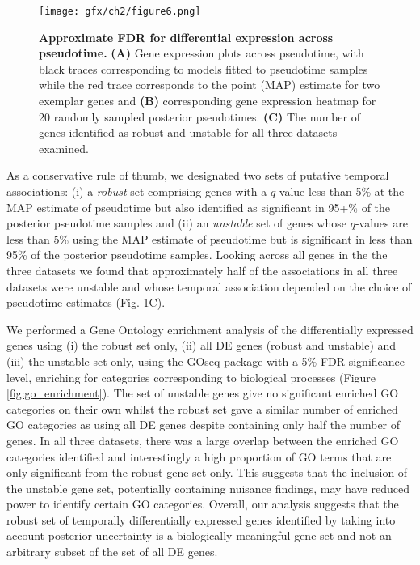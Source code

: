\begin{figure}
	\centering
	\texttt{[image: gfx/ch2/figure6.png]}
\caption{ {\bf Approximate FDR for differential expression across pseudotime.}
\textbf{(A)} Gene expression plots across pseudotime, with black traces corresponding to models fitted to pseudotime samples while the red trace corresponds to the point (MAP) estimate for two exemplar genes and \textbf{(B)} corresponding gene expression heatmap for 20 randomly sampled posterior pseudotimes.
\textbf{(C)} The number of genes identified as robust and unstable for all three datasets examined.}
\label{fig:afdr}
\end{figure}

As a conservative rule of thumb, we designated two sets of putative temporal associations: (i) a \emph{robust} set comprising genes with a $q$-value less than 5\% at the MAP estimate of pseudotime but also identified as significant in 95+\% of the posterior pseudotime samples and (ii) an \emph{unstable} set of genes whose $q$-values are less than 5\% using the MAP estimate of pseudotime but is significant in less than 95\% of the posterior pseudotime samples. Looking across all genes in the the three datasets we found that approximately half of the associations in all three datasets were unstable and whose temporal association depended on the choice of pseudotime estimates (Fig. \ref{fig:afdr}C).

We performed a Gene Ontology enrichment analysis of the differentially expressed genes using (i) the robust set only, (ii) all DE genes (robust and unstable) and (iii) the unstable set only, using the GOseq package \cite{young2010gene} with a 5\% FDR significance level, enriching for categories corresponding to biological processes (Figure \ref{fig:go_enrichment}). The set of unstable genes give no significant enriched GO categories on their own whilst the robust set gave a similar number of enriched GO categories as using all DE genes despite containing only half the number of genes. In all three datasets, there was a large overlap between the enriched GO categories identified and interestingly a high proportion of GO terms that are only significant from the robust gene set only. This suggests that the inclusion of the unstable gene set, potentially containing nuisance findings, may have reduced power to identify certain GO categories. Overall, our analysis suggests that the robust set of temporally differentially expressed genes identified by taking into account posterior uncertainty is a biologically meaningful gene set and not an arbitrary subset of the set of all DE genes.


